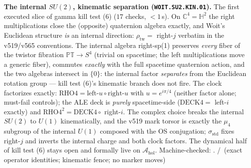 \documentclass[11pt,a4paper]{article}
\theoremstyle{definition}
\begin{document}
\par\smallskip\noindent\textbf{The internal $SU(2)$, kinematic
separation (\texttt{WOIT.SU2.KIN.01}).}
The first executed slice of gamma kill test (6) ($17$ checks,
${<}1$\,s).  On $\mathbb{C}^4=\mathbb{H}^2$ the right multiplications
close the (opposite) quaternion algebra exactly, and Woit's Euclidean
structure \emph{is} an internal direction:
$\rho_{\mathrm{tw}}=$ right-$j$ verbatim in the v519/v565
conventions.  The internal algebra right-sp(1) preserves \emph{every}
fiber of the twistor fibration $\mathbb{PT}\to S^4$ (trivial on
spacetime; the left multiplications move a generic fiber), commutes
\emph{exactly} with the full spacetime quaternion action, and the two
algebras intersect in $\{0\}$: the internal factor \emph{separates}
from the Euclidean rotation group --- kill test (6)'s kinematic
branch does not fire.  The clock factorizes exactly:
$\mathrm{RHO4}=\mathrm{left}\text{-}u\circ\mathrm{right}\text{-}u$
with $u=e^{i\pi/4}$ (neither factor alone; must-fail controls); the
ALE deck is \emph{purely} spacetime-side ($\mathrm{DECK4}=$ left-$i$
exactly) and $\mathrm{RHO4}^2=\mathrm{DECK4}\circ$ right-$i$.  The
complex choice breaks the internal $SU(2)$ to $U(1)$ kinematically,
and the v519 mark torsor is exactly the $\mu_4$ subgroup of the
internal $U(1)$ composed with the OS conjugation;
$\sigma_{\mathrm{std}}$ fixes right-$j$ and inverts the internal
charge and both clock factors.  The dynamical half of kill test (6)
stays open and formally live on $\mathcal A_{\mathrm{hol}}$.
Machine-checked: .
\mE/\mC\ (exact operator identities; kinematic fence; no marker moves)
\par\smallskip
\end{document}
